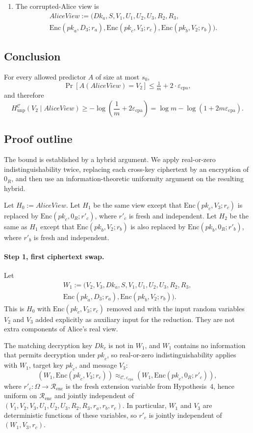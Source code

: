 \documentclass[11pt]{article}
\newcommand{\Renc}{\mathcal{R}_{\mathrm{enc}}}
\newcommand{\epscpa}{\varepsilon_{\mathrm{cpa}}}
\newcommand{\HunpC}{H_{\mathrm{unp}}^{\mathcal{C}}}
\newcommand{\C}{\mathcal{C}}
\newcommand{\Encf}{\mathrm{Enc}}
\newcommand{\AliceView}{\mathit{AliceView}}
\newcommand{\Dk}{\mathit{Dk}}
\newcommand{\pk}{\mathit{pk}}
\begin{document}
\begin{enumerate}
\item The corrupted-Alice view is
\begin{multline*}
\AliceView := \big( \Dk_a, S, V_1, U_1, U_2, U_3, R_2, R_3, \\
\Encf(\pk_a, D_3; r_a), \Encf(\pk_c, V_3; r_c), \Encf(\pk_b, V_2; r_b) \big).
\end{multline*}
\end{enumerate}

\subsection*{Conclusion}

For every allowed predictor $A$ of size at most $s_0$,
\[ \Pr[A(\AliceView) = V_2] \leq \tfrac{1}{m} + 2 \cdot \epscpa, \]
and therefore
\[
\HunpC(V_2 \mid \AliceView)
\geq -\log\left(\frac{1}{m} + 2 \epscpa\right)
= \log m - \log(1 + 2m\epscpa).
\]

\subsection*{Proof outline}

The bound is established by a hybrid argument. We apply real-or-zero indistinguishability twice, replacing each cross-key ciphertext by an encryption of $0_R$, and then use an information-theoretic uniformity argument on the resulting hybrid.

Let $H_0 := \AliceView$. Let $H_1$ be the same view except that $\Encf(\pk_c, V_3; r_c)$ is replaced by $\Encf(\pk_c, 0_R; r'_c)$, where $r'_c$ is fresh and independent. Let $H_2$ be the same as $H_1$ except that $\Encf(\pk_b, V_2; r_b)$ is also replaced by $\Encf(\pk_b, 0_R; r'_b)$, where $r'_b$ is fresh and independent.

\paragraph{Step 1, first ciphertext swap.} Let
\begin{multline*}
W_1 := \big( V_2, V_3, \Dk_a, S, V_1, U_1, U_2, U_3, R_2, R_3, \\
\Encf(\pk_a, D_3; r_a), \Encf(\pk_b, V_2; r_b) \big).
\end{multline*}
This is $H_0$ with $\Encf(\pk_c, V_3; r_c)$ removed and with the input random variables $V_2$ and $V_3$ added explicitly as auxiliary input for the reduction. They are not extra components of Alice's real view.

The matching decryption key $\Dk_c$ is not in $W_1$, and $W_1$ contains no information that permits decryption under $\pk_c$, so real-or-zero indistinguishability applies with $W_1$, target key $\pk_c$, and message $V_3$:
\[
(W_1, \Encf(\pk_c, V_3; r_c)) \approx_{\C, \epscpa} (W_1, \Encf(\pk_c, 0_R; r'_c)),
\]
where $r'_c : \Omega \to \Renc$ is the fresh extension variable from Hypothesis~4, hence uniform on $\Renc$ and jointly independent of $(V_1,V_2,V_3,U_1,U_2,U_3,R_2,R_3,r_a,r_b,r_c)$. In particular, $W_1$ and $V_3$ are deterministic functions of these variables, so $r'_c$ is jointly independent of $(W_1, V_3, r_c)$.
\end{document}
